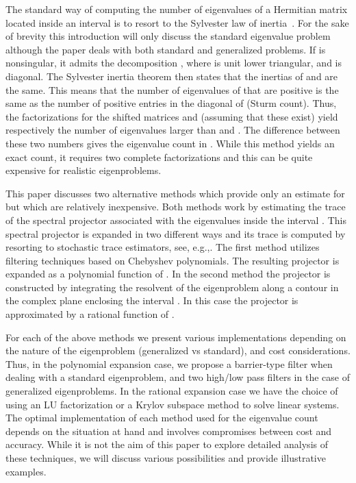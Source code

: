 \documentclass[12pt]{article}		\usepackage{tabls,multirow}
\begin{document}
The standard way of computing the number of eigenvalues 
of a Hermitian matrix  located inside
an interval  is to resort to the Sylvester law of
inertia~\cite{GVL-book}.  For the sake
of brevity this introduction will only  discuss the standard eigenvalue problem
although the paper deals with both standard and
generalized problems. 
If  is nonsingular, it admits the
decomposition , where  is unit lower triangular, and
 is diagonal. The Sylvester inertia theorem then states that the
inertias of  and  are the same. This means that the number of
eigenvalues of  that are positive is the same as the number of
positive entries in the diagonal of  (Sturm count). Thus, the
 factorizations for the shifted matrices  and  (assuming that these exist) yield respectively the number of
eigenvalues larger than  and . The difference between these two
numbers gives the eigenvalue count  in . While
this method yields an exact count, it requires two complete 
factorizations and this can be quite expensive for realistic
eigenproblems.

This paper discusses two alternative methods which provide only an
estimate for  but which are relatively inexpensive. Both
methods work by estimating the trace of the spectral projector 
associated with the eigenvalues inside the interval .  This
spectral projector is expanded in two different ways and its trace is
computed by resorting to stochastic trace estimators, see,
e.g.,\cite{Hutchinson-est,JTangYS}.  The first method utilizes
filtering techniques based on Chebyshev polynomials. The resulting
projector is expanded as a polynomial function of .  In the second
method the projector is constructed by integrating the resolvent of
the eigenproblem along a contour in the complex plane enclosing the
interval . In this case the projector is approximated by a
rational function of .  

For each of the above methods we present various implementations
depending on the nature of the eigenproblem (generalized vs standard),
and cost considerations.  Thus, in the polynomial expansion case, we
propose a barrier-type filter when dealing with a standard
eigenproblem, and two high/low pass filters in the case of generalized
eigenproblems. In the rational expansion case we have the choice of
using an LU factorization or a Krylov subspace method to solve linear
systems. The optimal implementation of each method used for the
eigenvalue count depends on the situation at hand and involves
compromises between cost and accuracy. 
While it is not the aim of this
paper to explore detailed analysis of these techniques, we will
discuss various possibilities and provide illustrative examples.
\end{document}
